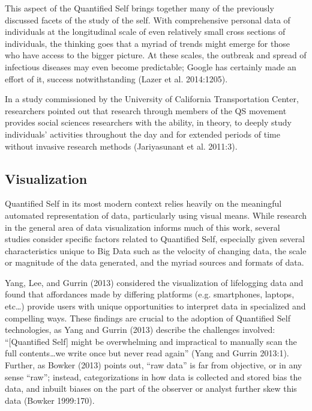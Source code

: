 \documentclass{article}
\begin{document}
This aspect of the Quantified Self brings together many of the previously discussed facets of the study of the self.
With comprehensive personal data of individuals at the longitudinal scale of even relatively small cross sections of individuals,
the thinking goes that a myriad of trends might emerge for those who have access to the bigger picture.
At these scales,
the outbreak and spread of infectious diseases may even become predictable;
Google has certainly made an effort of it,
success notwithstanding
(Lazer et al. 2014:1205). 

In a study commissioned by the University of California Transportation Center,
researchers pointed out that research through members of the QS movement provides social sciences researchers with the ability,
in theory,
to deeply study individuals' activities throughout the day and for extended periods of time without invasive research methods (Jariyasunant et al.
2011:3).

\subsection*{Visualization}
Quantified Self in its most modern context relies heavily on the meaningful automated representation of data,
particularly using visual means.
While research in the general area of data visualization informs much of this work,
several studies consider specific factors related to Quantified Self,
especially given several characteristics unique to Big Data such as the velocity of changing data,
the scale or magnitude of the data generated,
and the myriad sources and formats of data.

Yang,
Lee,
and Gurrin (2013) considered the visualization of lifelogging data and found that affordances made by differing platforms (e.g. 
smartphones,
laptops,
etc\dots) provide users with unique opportunities to interpret data in specialized and compelling ways.
These findings are crucial to the adoption of Quantified Self technologies,
as Yang and Gurrin (2013) describe the challenges involved: 
``[Quantified Self] might be overwhelming and impractical to manually scan the full contents\dots we write once but never read again''
(Yang and Gurrin 2013:1). 
Further,
as Bowker (2013) points out, 
``raw data'' is far from objective,
or in any sense ``raw'';
instead,
categorizations in how data is collected and stored bias the data,
and inbuilt biases on the part of the observer or analyst further skew this data
(Bowker 1999:170). 
\end{document}
